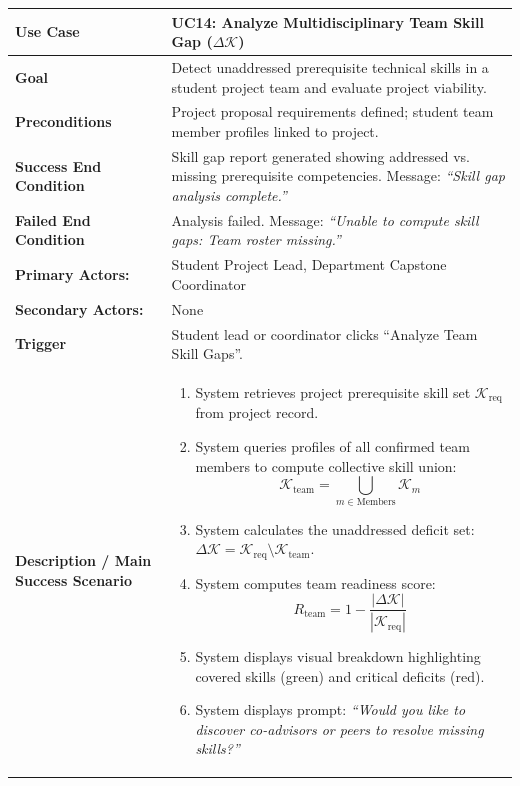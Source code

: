 \begin{table}[H]
\centering
\small
\begin{tabularx}{\textwidth}{|l|X|}
\hline
\rowcolor{lightgray!40} \textbf{Use Case} & \textbf{UC14: Analyze Multidisciplinary Team Skill Gap ($\Delta \mathcal{K}$)} \\ \hline
\textbf{Goal} & Detect unaddressed prerequisite technical skills in a student project team and evaluate project viability. \\ \hline
\textbf{Preconditions} & Project proposal requirements defined; student team member profiles linked to project. \\ \hline
\textbf{Success End Condition} & Skill gap report generated showing addressed vs. missing prerequisite competencies. Message: \textit{``Skill gap analysis complete.''} \\ \hline
\textbf{Failed End Condition} & Analysis failed. Message: \textit{``Unable to compute skill gaps: Team roster missing.''} \\ \hline
\textbf{Primary Actors:} & Student Project Lead, Department Capstone Coordinator \\
\textbf{Secondary Actors:} & None \\ \hline
\textbf{Trigger} & Student lead or coordinator clicks ``Analyze Team Skill Gaps''. \\ \hline
\textbf{Description / Main Success Scenario} &
\begin{enumerate}[leftmargin=*]
    \item System retrieves project prerequisite skill set $\mathcal{K}_{\text{req}}$ from project record.
    \item System queries profiles of all confirmed team members to compute collective skill union:
    $$\mathcal{K}_{\text{team}} = \bigcup_{m \in \text{Members}} \mathcal{K}_m$$
    \item System calculates the unaddressed deficit set: $\Delta \mathcal{K} = \mathcal{K}_{\text{req}} \setminus \mathcal{K}_{\text{team}}$.
    \item System computes team readiness score:
    $$R_{\text{team}} = 1 - \frac{|\Delta \mathcal{K}|}{|\mathcal{K}_{\text{req}}|}$$
    \item System displays visual breakdown highlighting covered skills (green) and critical deficits (red).
    \item System displays prompt: \textit{``Would you like to discover co-advisors or peers to resolve missing skills?''}
\end{enumerate} \\ \hline

\end{tabularx}
\end{table}
